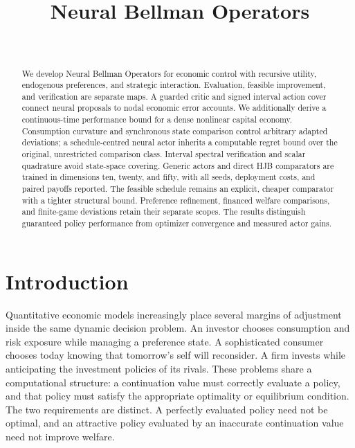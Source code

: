 \documentclass[ecta,draft]{econsocart}
\theoremstyle{definition}
\theoremstyle{remark}
\begin{document}
\begin{frontmatter}
\title{Neural Bellman Operators}
\begin{aug}
\author[id=au1,addressref={add1}]{~}
\address[id=add1]{Peking University}
\end{aug}
\begin{abstract}
We develop Neural Bellman Operators for economic control with recursive utility, endogenous preferences, and strategic interaction. Evaluation, feasible improvement, and verification are separate maps. A guarded critic and signed interval action cover connect neural proposals to nodal economic error accounts. We additionally derive a continuous-time performance bound for a dense nonlinear capital economy. Consumption curvature and synchronous state comparison control arbitrary adapted deviations; a schedule-centred neural actor inherits a computable regret bound over the original, unrestricted comparison class. Interval spectral verification and scalar quadrature avoid state-space covering. Generic actors and direct HJB comparators are trained in dimensions ten, twenty, and fifty, with all seeds, deployment costs, and paired payoffs reported. The feasible schedule remains an explicit, cheaper comparator with a tighter structural bound. Preference refinement, financed welfare comparisons, and finite-game deviations retain their separate scopes. The results distinguish guaranteed policy performance from optimizer convergence and measured actor gains.
\end{abstract}
\begin{keyword}
\end{keyword}
\end{frontmatter}

\section{Introduction}\label{sec:introduction}
Quantitative economic models increasingly place several margins of adjustment inside the same dynamic decision problem. An investor chooses consumption and risk exposure while managing a preference state. A sophisticated consumer chooses today knowing that tomorrow's self will reconsider. A firm invests while anticipating the investment policies of its rivals. These problems share a computational structure: a continuation value must correctly evaluate a policy, and that policy must satisfy the appropriate optimality or equilibrium condition. The two requirements are distinct. A perfectly evaluated policy need not be optimal, and an attractive policy evaluated by an inaccurate continuation value need not improve welfare.
\end{document}
